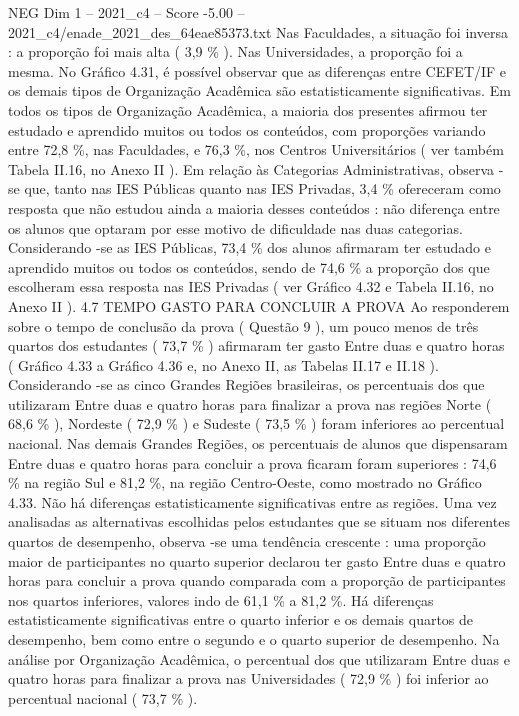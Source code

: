 \begin{textsample}{NEG Dim 1 – 2021\_c4 – Score -5.00 – 2021\_c4/enade\_2021\_des\_64eae85373.txt}
Nas Faculdades, a situação foi inversa : a proporção foi mais alta ( 3,9 \% ).
Nas Universidades, a proporção foi a mesma.
No Gráfico 4.31, é possível observar que as diferenças entre CEFET/IF e os demais tipos de Organização Acadêmica são estatisticamente significativas.
Em todos os tipos de Organização Acadêmica, a maioria dos presentes afirmou ter estudado e aprendido muitos ou todos os conteúdos, com proporções variando entre 72,8 \%, nas Faculdades, e 76,3 \%, nos Centros Universitários ( ver também Tabela II.16, no Anexo II ).
Em relação às Categorias Administrativas, observa -se que, tanto nas IES Públicas quanto nas IES Privadas, 3,4 \% ofereceram como resposta que não estudou ainda a maioria desses conteúdos : não diferença entre os alunos que optaram por esse motivo de dificuldade nas duas categorias.
Considerando -se as IES Públicas, 73,4 \% dos alunos afirmaram ter estudado e aprendido muitos ou todos os conteúdos, sendo de 74,6 \% a proporção dos que escolheram essa resposta nas IES Privadas ( ver Gráfico 4.32 e Tabela II.16, no Anexo II ). 4.7 TEMPO GASTO PARA CONCLUIR A PROVA Ao responderem sobre o tempo de conclusão da prova ( Questão 9 ), um pouco menos de três quartos dos estudantes ( 73,7 \% ) afirmaram ter gasto Entre duas e quatro horas ( Gráfico 4.33 a Gráfico 4.36 e, no Anexo II, as Tabelas II.17 e II.18 ).
Considerando -se as cinco Grandes Regiões brasileiras, os percentuais dos que utilizaram Entre duas e quatro horas para finalizar a prova nas regiões Norte ( 68,6 \% ), Nordeste ( 72,9 \% ) e Sudeste ( 73,5 \% ) foram inferiores ao percentual nacional.
Nas demais Grandes Regiões, os percentuais de alunos que dispensaram Entre duas e quatro horas para concluir a prova ficaram foram superiores : 74,6 \% na região Sul e 81,2 \%, na região Centro-Oeste, como mostrado no Gráfico 4.33.
Não há diferenças estatisticamente significativas entre as regiões.
Uma vez analisadas as alternativas escolhidas pelos estudantes que se situam nos diferentes quartos de desempenho, observa -se uma tendência crescente : uma proporção maior de participantes no quarto superior declarou ter gasto Entre duas e quatro horas para concluir a prova quando comparada com a proporção de participantes nos quartos inferiores, valores indo de 61,1 \% a 81,2 \%.
Há diferenças estatisticamente significativas entre o quarto inferior e os demais quartos de desempenho, bem como entre o segundo e o quarto superior de desempenho.
Na análise por Organização Acadêmica, o percentual dos que utilizaram Entre duas e quatro horas para finalizar a prova nas Universidades ( 72,9 \% ) foi inferior ao percentual nacional ( 73,7 \% ).

\end{textsample}

